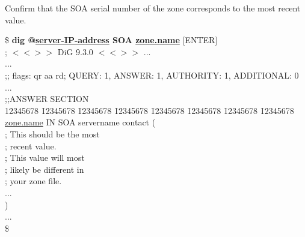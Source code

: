Confirm that the SOA serial number of the zone corresponds to the most
recent value.

\begin{tabbing}
\hspace{0.5in}\$ {\bf dig @\underline{server-IP-address} SOA \underline{zone.name}} $[$ENTER$]$ \\
\hspace{0.5in} ; $<$$<$$>$$>$ DiG 9.3.0 $<$$<$$>$$>$ ... \\
\hspace{0.5in} ... \\
\hspace{0.5in} ;; flags: qr aa rd; QUERY: 1, ANSWER: 1, AUTHORITY: 1, ADDITIONAL: 0 \\
\hspace{0.5in} ... \\
\hspace{0.5in} ;;ANSWER SECTION \\
\hspace{0.5in} 12345678 \= 12345678 \= 12345678 \= 12345678 \= 12345678 \= 12345678 \= 12345678 \= 12345678 \kill
\hspace{0.5in} \underline{zone.name} \>  \> IN \> SOA \> servername contact ( \\
\hspace{0.5in}	\> \> \>  ; This should be the most  \\
\hspace{0.5in}	\> \> \> \> \> ; recent value. \\
\hspace{0.5in}	\> \> \> \> \> ; This value will most \\
\hspace{0.5in}	\> \> \> \> \> ; likely be different in \\
\hspace{0.5in}	\> \> \> \> \> ; your zone file. \\
\hspace{0.5in}				... \\
\hspace{0.5in} \> ) \\
\hspace{0.5in}... \\
\hspace{0.5in}\$ \\

\end{tabbing}
